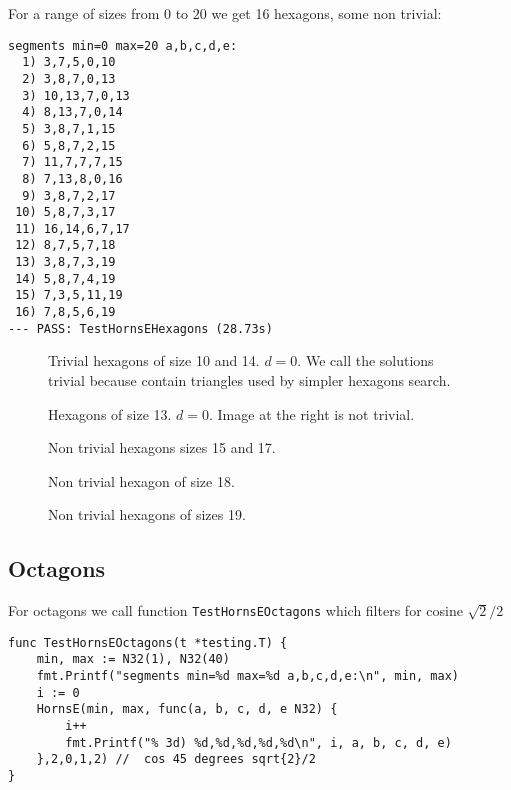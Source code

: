\documentclass[11pt]{article}
\begin{document}
For a range of sizes from $0$ to $20$ we get 16 hexagons, some non trivial:
\begin{lstlisting}
segments min=0 max=20 a,b,c,d,e:
  1) 3,7,5,0,10
  2) 3,8,7,0,13
  3) 10,13,7,0,13
  4) 8,13,7,0,14
  5) 3,8,7,1,15
  6) 5,8,7,2,15
  7) 11,7,7,7,15
  8) 7,13,8,0,16
  9) 3,8,7,2,17
 10) 5,8,7,3,17
 11) 16,14,6,7,17
 12) 8,7,5,7,18
 13) 3,8,7,3,19
 14) 5,8,7,4,19
 15) 7,3,5,11,19
 16) 7,8,5,6,19
--- PASS: TestHornsEHexagons (28.73s)
\end{lstlisting}

\begin{figure}[H]
\centering
{}
\caption{Trivial hexagons of size 10 and 14. $d=0$.
We call the solutions trivial because contain triangles used by simpler hexagons search.}
\end{figure}

\begin{figure}[H]
\centering
{}
\caption{Hexagons of size 13. $d=0$. Image at the right is not trivial.}
\end{figure}

\begin{figure}[H]
\centering
{}
\caption{Non trivial hexagons sizes 15 and 17.}
\end{figure}

\begin{figure}[H]
\centering
{}
\caption{Non trivial hexagon of size 18.}
\end{figure}

\begin{figure}[H]
\centering
{}
\caption{Non trivial hexagons of sizes 19.}
\end{figure}


\subsection{Octagons}

For octagons we call function \texttt{TestHornsEOctagons} which filters for
cosine $\sqrt{2}/2$
\begin{lstlisting}
func TestHornsEOctagons(t *testing.T) {
	min, max := N32(1), N32(40)
	fmt.Printf("segments min=%d max=%d a,b,c,d,e:\n", min, max)
	i := 0
	HornsE(min, max, func(a, b, c, d, e N32) {
		i++
		fmt.Printf("% 3d) %d,%d,%d,%d,%d\n", i, a, b, c, d, e)
	},2,0,1,2) //  cos 45 degrees sqrt{2}/2
}
\end{lstlisting}
\end{document}
